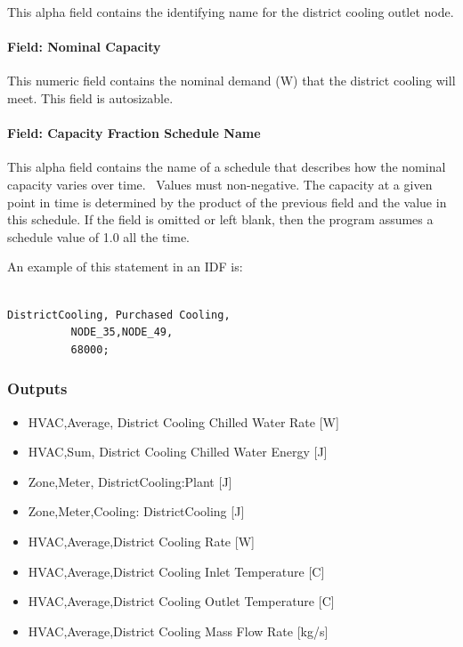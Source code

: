 This alpha field contains the identifying name for the district cooling outlet node.

\paragraph{Field: Nominal Capacity}\label{field-nominal-capacity-10}

This numeric field contains the nominal demand (W) that the district cooling will meet. This field is autosizable.

\paragraph{Field: Capacity Fraction Schedule Name}\label{field-capacity-fraction-schedule-name}

This alpha field contains the name of a schedule that describes how the nominal capacity varies over time.~ Values must non-negative. The capacity at a given point in time is determined by the product of the previous field and the value in this schedule. If the field is omitted or left blank, then the program assumes a schedule value of 1.0 all the time.

An example of this statement in an IDF is:

\begin{lstlisting}

DistrictCooling, Purchased Cooling,
          NODE_35,NODE_49,
          68000;
\end{lstlisting}

\subsubsection{Outputs}\label{outputs-14-003}

\begin{itemize}
\item
  HVAC,Average, District Cooling Chilled Water Rate {[}W{]}
\item
  HVAC,Sum, District Cooling Chilled Water Energy {[}J{]}
\item
  Zone,Meter, DistrictCooling:Plant {[}J{]}
\item
  Zone,Meter,Cooling: DistrictCooling {[}J{]}
\item
  HVAC,Average,District Cooling Rate {[}W{]}
\item
  HVAC,Average,District Cooling Inlet Temperature {[}C{]}
\item
  HVAC,Average,District Cooling Outlet Temperature {[}C{]}
\item
  HVAC,Average,District Cooling Mass Flow Rate {[}kg/s{]}
\end{itemize}

